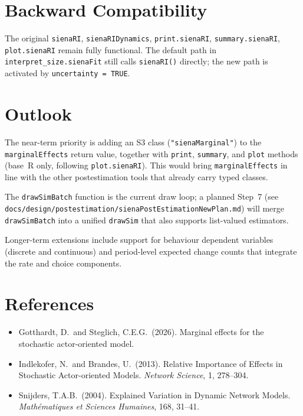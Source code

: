 \documentclass[11pt,a4paper]{article}
\begin{document}
\section{Backward Compatibility}

The original \texttt{sienaRI}, \texttt{sienaRIDynamics},
\texttt{print.sienaRI}, \texttt{summary.sienaRI}, \texttt{plot.sienaRI}
remain fully functional.  The default path in \texttt{interpret\_size.sienaFit}
still calls \texttt{sienaRI()} directly; the new path is activated by
\texttt{uncertainty = TRUE}.


\section{Outlook}

The near-term priority is adding an S3 class (\texttt{"sienaMarginal"})
to the \texttt{marginalEffects} return value, together with
\texttt{print}, \texttt{summary}, and \texttt{plot} methods (base~R
only, following \texttt{plot.sienaRI}).  This would bring
\texttt{marginalEffects} in line with the other postestimation tools
that already carry typed classes.

The \texttt{drawSimBatch} function is the current draw loop; a planned
Step~7 (see \texttt{docs/design/postestimation/sienaPostEstimationNewPlan.md})
will merge \texttt{drawSimBatch} into a unified \texttt{drawSim} that also
supports list-valued estimators.

Longer-term extensions include support for behaviour dependent variables
(discrete and continuous) and period-level expected change counts that
integrate the rate and choice components.


\section{References}

\begin{itemize}
  \item Gotthardt, D.\ and Steglich, C.E.G.\ (2026).
    Marginal effects for the stochastic actor-oriented model.
  \item Indlekofer, N.\ and Brandes, U.\ (2013).
    Relative Importance of Effects in Stochastic Actor-oriented Models.
    \emph{Network Science}, 1, 278--304.
  \item Snijders, T.A.B.\ (2004).
    Explained Variation in Dynamic Network Models.
    \emph{Math\'{e}matiques et Sciences Humaines}, 168, 31--41.
\end{itemize}
\end{document}
